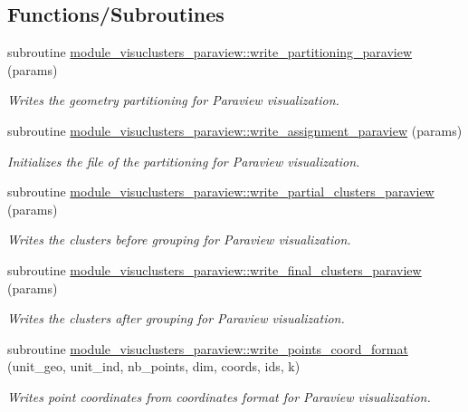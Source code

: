 \subsection*{Functions/\+Subroutines}
\begin{DoxyCompactItemize}
\item 
subroutine \hyperlink{namespacemodule__visuclusters__paraview_a57010b34c7586dcf52fb9f50e2e1d7aa}{module\+\_\+visuclusters\+\_\+paraview\+::write\+\_\+partitioning\+\_\+paraview} (params)
\begin{DoxyCompactList}\small\item\em Writes the geometry partitioning for Paraview visualization. \end{DoxyCompactList}\item 
subroutine \hyperlink{namespacemodule__visuclusters__paraview_ad93eb4e679b429c757fcbf8831469a91}{module\+\_\+visuclusters\+\_\+paraview\+::write\+\_\+assignment\+\_\+paraview} (params)
\begin{DoxyCompactList}\small\item\em Initializes the file of the partitioning for Paraview visualization. \end{DoxyCompactList}\item 
subroutine \hyperlink{namespacemodule__visuclusters__paraview_abed87b4c957689d9cfdc62811f3b213b}{module\+\_\+visuclusters\+\_\+paraview\+::write\+\_\+partial\+\_\+clusters\+\_\+paraview} (params)
\begin{DoxyCompactList}\small\item\em Writes the clusters before grouping for Paraview visualization. \end{DoxyCompactList}\item 
subroutine \hyperlink{namespacemodule__visuclusters__paraview_a7e7514cf4abb2a7e0a8fa1d23252811e}{module\+\_\+visuclusters\+\_\+paraview\+::write\+\_\+final\+\_\+clusters\+\_\+paraview} (params)
\begin{DoxyCompactList}\small\item\em Writes the clusters after grouping for Paraview visualization. \end{DoxyCompactList}\item 
subroutine \hyperlink{namespacemodule__visuclusters__paraview_af62b5ff6548f1fd716d4931df4edeaf3}{module\+\_\+visuclusters\+\_\+paraview\+::write\+\_\+points\+\_\+coord\+\_\+format} (unit\+\_\+geo, unit\+\_\+ind, nb\+\_\+points, dim, coords, ids, k)
\begin{DoxyCompactList}\small\item\em Writes point coordinates from coordinates format for Paraview visualization. \end{DoxyCompactList}\item 

\end{DoxyCompactItemize}
